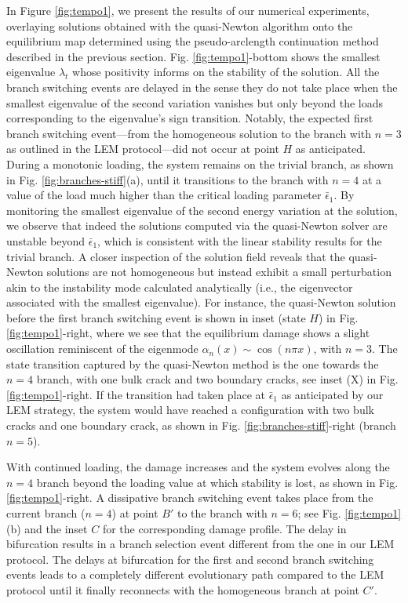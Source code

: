In Figure \ref{fig:tempo1}, we present the results of our numerical experiments, overlaying solutions obtained with the quasi-Newton algorithm onto the equilibrium map determined using the pseudo-arclength continuation method described in the previous section. Fig. \ref{fig:tempo1}-bottom shows the smallest eigenvalue $\lambda_t$ whose positivity informs on the stability of the solution. All the branch switching events are delayed in the sense they do not take place when the smallest eigenvalue of the second variation vanishes but only beyond the loads corresponding to the eigenvalue's sign transition. Notably, the expected first branch switching event—from the {homogeneous} solution to the branch with \(n=3\) as outlined in the LEM protocol—did not occur at point $H$ as anticipated. During a monotonic loading, the system remains on the trivial branch, as shown in Fig. \ref{fig:branches-stiff}(a), until it transitions to the branch with \(n=4\) at a value of the load much higher than the critical loading parameter \(\bar{\epsilon}_1\). By monitoring the smallest eigenvalue of the second energy variation at the solution, we observe that indeed the solutions computed via the quasi-Newton solver are unstable beyond \(\bar{\epsilon}_1\), which is consistent with the linear stability results for the trivial branch. A closer inspection of the solution field reveals that the quasi-Newton solutions are not homogeneous but instead exhibit a small perturbation akin to the instability mode calculated analytically (i.e., the eigenvector associated with the smallest eigenvalue). For instance, the  quasi-Newton solution before the first branch switching event is shown in inset (state $H$) in Fig. \ref{fig:tempo1}-right, where we see that the equilibrium damage shows a slight oscillation reminiscent of the eigenmode \(\alpha_n(x) \sim \cos(n\pi x)\), with \(n=3\). The state transition captured by the quasi-Newton method is the one towards the \(n=4\) branch, with one bulk crack and two boundary cracks, see inset (X) in Fig. \ref{fig:tempo1}-right. If the transition had taken place at \(\bar{\epsilon}_1\) as anticipated by our LEM strategy, the system would have reached a configuration with two bulk cracks and one boundary crack, as shown in Fig. \ref{fig:branches-stiff}-right (branch $n=5$).

With continued loading, the damage increases and the system evolves along the \(n=4\) branch beyond the loading value at which stability is lost, as shown in Fig. \ref{fig:tempo1}-right. A dissipative branch switching event takes place from the current branch (\(n=4\)) at point \(B'\) to the branch with \(n=6\); see Fig. \ref{fig:tempo1}(b) and the inset $C$ for the corresponding damage profile. The delay in bifurcation results in a branch selection event different from the one in our LEM protocol. The delays at bifurcation for the first and second branch switching events leads to a completely different evolutionary path compared to the LEM protocol until it finally reconnects with the homogeneous branch at point \(C'\).

